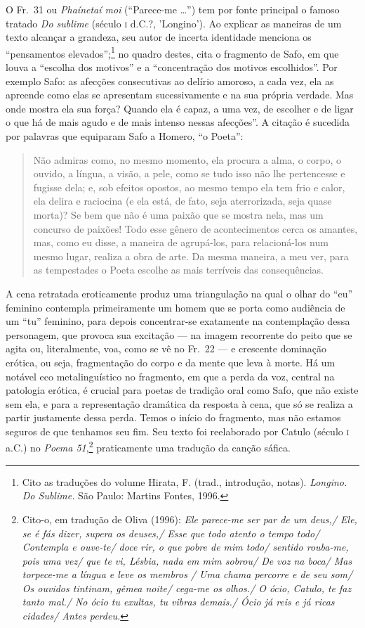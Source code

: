 {\small O Fr.~31 ou \textit{Phaínetaí moi} (“Parece-me \ldots{}”) tem por fonte
principal o famoso tratado \textit{Do sublime} (século \textsc{i} d.C.?, 'Longino'). Ao
explicar as maneiras de um texto alcançar a grandeza, seu autor de incerta identidade menciona os
“pensamentos elevados”;\footnote{ Cito as traduções do volume Hirata,
F. (trad., introdução, notas). \textit{Longino.} \textit{Do Sublime.} São
Paulo: Martins Fontes, 1996.} no quadro destes, cita o fragmento de Safo,
em que louva a “escolha dos motivos” e a “concentração dos
motivos escolhidos”. Por exemplo Safo: as afecções consecutivas ao delírio
amoroso, a cada vez, ela as apreende como elas se apresentam sucessivamente e
na sua própria verdade. Mas onde mostra ela sua força? Quando ela é capaz, a
uma vez, de escolher e de ligar o que há de mais agudo e de mais
intenso nessas afecções”. A citação é sucedida por palavras que equiparam Safo
a Homero, “o Poeta”: 

\begin{quote}
Não admiras como, no mesmo momento, ela
procura a alma, o corpo, o ouvido, a língua, a visão, a pele, como se tudo isso
não lhe pertencesse e fugisse dela; e, sob efeitos opostos, ao mesmo tempo ela
tem frio e calor, ela delira e raciocina (e ela está, de fato, seja
aterrorizada, seja quase morta)? Se bem que não é uma paixão que se mostra
nela, mas um concurso de paixões! Todo esse gênero de acontecimentos cerca os
amantes, mas, como eu disse, a maneira de agrupá-los, para relacioná-los num
mesmo lugar, realiza a obra de arte. Da mesma maneira, a meu ver, para as
tempestades o Poeta escolhe as mais terríveis das consequências.
\end{quote}

A cena retratada eroticamente produz uma triangulação na qual o olhar do “eu”
feminino contempla primeiramente um homem que se porta como audiência de um
“tu” feminino, para depois concentrar-se exatamente na contemplação dessa
personagem, que provoca sua excitação --- na imagem recorrente do peito que se agita ou,
literalmente, voa, como se vê no Fr.~22 --- e crescente dominação erótica, ou
seja, fragmentação do corpo e da mente que leva à morte. Há um notável eco
metalinguístico no fragmento, em que a perda da voz, central na patologia
erótica, é crucial para poetas de tradição oral como Safo, que não existe sem
ela, e para a representação dramática da resposta à cena, que só se realiza a
partir justamente dessa perda. Temos o início do fragmento, mas não estamos
seguros de que tenhamos seu fim. Seu texto foi reelaborado por Catulo (século \textsc{i}
a.C.) no \textit{Poema 51},\footnote{ Cito-o, em tradução de Oliva (1996):
\textit{Ele parece-me ser par de um deus,/ Ele, se é fás dizer, supera os
deuses,/ Esse que todo atento o tempo todo/ Contempla e ouve-te/ doce rir, o
que pobre de mim todo/ sentido rouba-me, pois uma vez/ que te vi, Lésbia,
nada em mim sobrou/ De voz na boca/ Mas torpece-me a língua e leve os membros
/ Uma chama percorre e de seu som/ Os ouvidos tintinam, gêmea noite/ cega-me
os olhos./ O ócio, Catulo, te faz tanto mal./ No ócio tu exultas, tu vibras
demais./ Ócio já reis e já ricas cidades/ Antes perdeu.}} praticamente uma
tradução da canção sáfica.}


